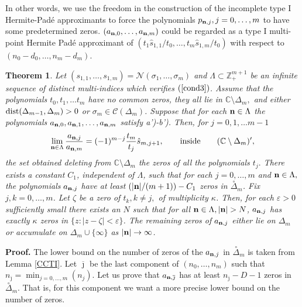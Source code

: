 \documentclass[10pt,a4paper]{article}
\newtheorem{theorem}{Theorem}[section]
\theoremstyle{definition}
\theoremstyle{remark}
\numberwithin{equation}{section}
\begin{document}
In other words, we use the freedom in the construction of the incomplete type I Hermite-Pad\'e approximants to force the polynomials $p_{{\bf n},j}, j=0,\ldots,m$ to have some predetermined zeros. $(a_{{\bf n},0},\ldots,a_{{\bf n},m})$ could be regarded as a type I multi-point Hermite Pad\'e approximant of $(t_1\widehat{s}_{1,1}/t_0,\ldots,t_m\widehat{s}_{1,m}/t_0)$ with respect to $(n_0-d_0,\ldots,n_m-d_m)$.


\begin{theorem}\label{CTI}
Let $(s_{1,1},\ldots,s_{1,m}) = \mathcal{N}(\sigma_1,\ldots,\sigma_m)$ and $\Lambda \subset \mathbb{Z}_+^{m+1}$ be an infinite sequence of distinct multi-indices which verifies $(\ref{cond3})$.  Assume  that the polynomials $t_{0},t_{1},\ldots t_{m}$  have no common zeros, they all  lie in $\mathbb{C}\setminus \Delta_{m},$
and either $\mbox{\rm dist}(\Delta_{m-1},\Delta_m)> 0$  or $\sigma_m \in \mathcal{C}(\Delta_m)$. Suppose that for each ${\bf n} \in \Lambda$ the polynomials $a_{{{\bf n}},0},a_{{{\bf n}},1}, \ldots, a_{{{\bf n}},m}$ satisfy {\rm a')-b')}.
Then, for $j=0,1,\ldots m-1$
\begin{equation} \label{cu} \displaystyle \lim_{{\bf n}\in \Lambda}\frac{a_{{{\bf n}},j}}{a_{{{\bf n}},m}}= (-1)^{m-j}\frac{t_m}{t_j}\hat{s}_{m,j+1},\qquad  \mbox{inside} \qquad (\mathbb{C}\setminus \Delta_{m})^{\prime},
\end{equation}
the set obtained deleting from $\mathbb{C}\setminus \Delta_{m} $ the zeros of all the polynomials $t_j.$ There exists a constant $C_1$, independent of $\Lambda$, such that for each $j=0,\ldots,m$ and ${\bf n} \in \Lambda,$ the polynomials $a_{{\bf n},j}$  have at least $(|{\bf n}|/(m+1)) - C_1$ zeros in $\stackrel{\circ}{\Delta}_m $. Fix $j,k=0,\ldots,m$. Let $\zeta$ be a zero of $t_k, k\neq j,$ of multiplicity $\kappa$. Then, for each $\varepsilon >0$ sufficiently small there exists an $N$ such that for all ${\bf n} \in \Lambda, |{\bf n}| > N$, $a_{{\bf n},j}$ has exactly $\kappa$ zeros in $\{z:|z-\zeta| < \varepsilon\}$. The remaining zeros of $a_{{\bf n},j}$ either lie on $\Delta_m$ or accumulate on $\Delta_m \cup \{\infty\}$ as $|{\bf n}| \to \infty$.
\end{theorem}


{\bf Proof.} The lower bound on the number of zeros of the $a_{{\bf n},j}$ in $\stackrel{\circ}{\Delta}_m $ is taken from Lemma \ref{CCTI}. Let $\overline{\jmath}$ be the last component of $(n_0,\ldots,n_m)$ such that $n_{\overline{\jmath}} = \min_{j=0,\ldots,m} (n_j)$.  Let us prove that  $a_{{\bf n},\overline{\jmath}}$ has at least $n_{\overline{\jmath}}-D -1$  zeros in $\stackrel{\circ}{\Delta}_{m} $. That is, for this component we want a more precise lower bound on the number of zeros.
\end{document}
